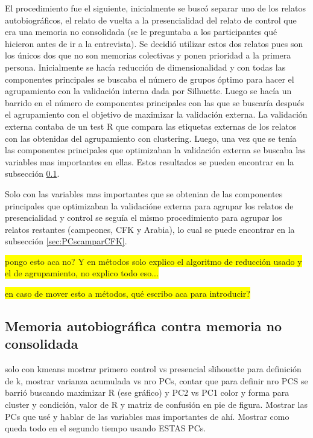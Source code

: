 El procedimiento fue el siguiente, inicialmente se buscó separar uno de los relatos autobiográficos, el relato de vuelta a la presencialidad del relato de control que era una memoria no consolidada (se le preguntaba a los participantes qué hicieron antes de ir a la entrevista). Se decidió utilizar estos dos relatos pues son los únicos dos que no son memorias colectivas y ponen prioridad a la primera persona. 
Inicialmente se hacía reducción de dimensionalidad y con todas las componentes principales se buscaba el número de grupos óptimo para hacer el agrupamiento con la validación interna dada por Silhuette. Luego se hacía un barrido en el número de componentes principales con las que se buscaría después el agrupamiento con el objetivo de maximizar la validación externa. La validación externa contaba de un test R que compara las etiquetas externas de los relatos con las obtenidas del agrupamiento con clustering. Luego, una vez que se tenía las componentes principales que optimizaban la validación externa se buscaba las variables mas importantes en ellas. Estos resultados se pueden encontrar en la subsección \ref{sec:PCspresvscontrol}.

Solo con las variables mas importantes que se obtenian de las componentes principales que optimizaban la validacióne externa para agrupar los relatos de presencialidad y control se seguía el mismo procedimiento para agrupar los relatos restantes (campeones, CFK y Arabia), lo cual se puede encontrar en la subsección \ref{sec:PCscamparCFK}.

\colorbox{yellow}{pongo esto aca no? Y en métodos solo explico el algoritmo de reducción usado y el de agrupamiento, no explico todo eso...}

\colorbox{yellow}{en caso de mover esto a métodos, qué escribo aca para introducir?}

\subsection{Memoria autobiográfica contra memoria no consolidada}
\label{sec:PCspresvscontrol}
solo con kmeans mostrar 
primero control vs presencial slihouette para definición de k, mostrar varianza acumulada vs nro PCs, contar que para definir nro PCS se barrió buscando maximizar R (ese gráfico) y PC2 vs PC1 color y forma para cluster y condición, valor de R y matriz de confusión en pie de figura. Mostrar las PCs que usé y hablar de las variables mas importantes de ahí. Mostrar como queda todo en el segundo tiempo usando ESTAS PCs.
